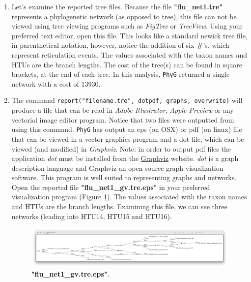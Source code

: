 \documentclass[11pt]{article}
\newcommand{\phyg}{\texttt{PhyG} }
\begin{document}
\begin{enumerate}
\item Let's examine the reported tree files. Because the file \textbf{"flu\_net1.tre"} 
represents a phylogenetic network (as opposed to tree), this file can not be viewed 
using tree viewing programs such as \textit{FigTree} or \textit{TreeView}. Using 
your preferred text editor, open this file. This looks like a standard newick tree file, 
in parenthetical notation, however, notice the addition of six \textbf{\#}'s, which 
represent reticulation events. The values associated with the taxon names and 
HTUs are the branch lengths. The cost of the tree(s) can be found in square 
brackets, at the end of each tree. In this analysis, \phyg returned a single network
 with a cost of 13930.

\item  The command \texttt{report("filename.tre", dotpdf, graphs, overwrite)} will 
produce a file that can be read in \textit{Adobe Illustrator}, \textit{Apple Preview} 
or any vectorial image editor program. Notice that two files were outputted from 
using this command. \phyg has output an eps (on OSX) or pdf (on linux) file that 
can be viewed in a vector graphics program and a dot file, which can be viewed 
(and modified) in \textit{Graphviz}. Note: in order to output pdf files the application 
\textit{dot} must be installed from the \href{https://graphviz.org/download/}{Graphviz} 
website. \textit{dot} is a graph description language and Graphviz an open-source 
graph visualization software. This program is well suited to representing graphs 
and networks. Open the reported file \textbf{"flu\_net1\_gv.tre.eps"} in your preferred
visualization program (Figure \ref{eps1}). The values associated with the taxon 
names and HTUs are the branch lengths. Examining this file, we can see three 
networks (leading into HTU14, HTU15 and HTU16).

\begin{figure}[H]
\centering
\includegraphics[width=\textwidth]{eps1.png}
\caption{\textbf{"flu\_net1\_gv.tre.eps"}.}
\label{eps1}
\end{figure}

\end{enumerate}
\end{document}
